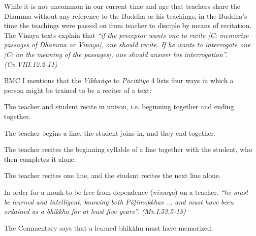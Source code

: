 While it is not uncommon in our current time and age that teachers share the Dhamma without any reference to the Buddha or his teachings, in the Buddha's time the teachings were passed on from teacher to disciple by means of recitation. The Vinaya texts explain that \textit{``if the preceptor wants one to recite [C: memorize passages of Dhamma or Vinaya], one should recite. If he wants to interrogate one [C: on the meaning of the passages], one should answer his interrogation''. (Cv.VIII.12.2-11)}

BMC I mentions that the \textit{Vibhaṅga} to \textit{Pācittiya} 4 lists four ways in which a person might be trained to be a reciter of a text:


\ifbfiveversion
\begin{packedenumerate}
  \item The teacher and student recite in unison, i.e. beginning together and ending together.
  \item The teacher begins a line, the student joins in, and they end together.
  \item The teacher recites the beginning syllable of a line together with the student, who then completes it alone.
  \item The teacher recites one line, and the student recites the next line alone.
\end{packedenumerate}
\else
\fi

\ifninebythirteenversion\clearpage\fi

In order for a monk to be free from dependence (\textit{nissaya}) on a teacher, \textit{``he must be learned and intelligent, knowing both Pāṭimokkhas ... and must have been ordained as a bhikkhu for at least five years''. (Mv.I.53.5-13)}

The Commentary says that a learned bhikkhu must have memorized:

